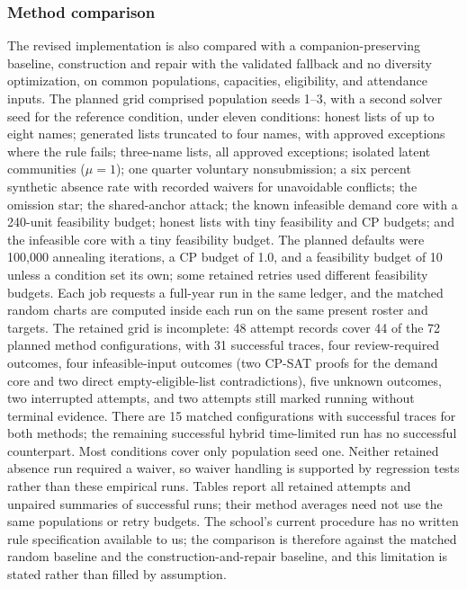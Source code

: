 \documentclass[11pt,a4paper]{article}
\theoremstyle{definition}\newtheorem{definition}[theorem]{Definition}
\theoremstyle{remark}\newtheorem{remark}[theorem]{Remark}
\begin{document}
\subsubsection*{Method comparison}\label{sec:evaldesign}
The revised implementation is also compared with a companion-preserving baseline, construction and repair with the validated fallback and no diversity optimization, on common populations, capacities, eligibility, and attendance inputs. The planned grid comprised population seeds 1--3, with a second solver seed for the reference condition, under eleven conditions: honest lists of up to eight names; generated lists truncated to four names, with approved exceptions where the rule fails; three-name lists, all approved exceptions; isolated latent communities ($\mu=1$); one quarter voluntary nonsubmission; a six percent synthetic absence rate with recorded waivers for unavoidable conflicts; the omission star; the shared-anchor attack; the known infeasible demand core with a 240-unit feasibility budget; honest lists with tiny feasibility and CP budgets; and the infeasible core with a tiny feasibility budget. The planned defaults were 100,000 annealing iterations, a CP budget of 1.0, and a feasibility budget of 10 unless a condition set its own; some retained retries used different feasibility budgets. Each job requests a full-year run in the same ledger, and the matched random charts are computed inside each run on the same present roster and targets. The retained grid is incomplete: 48 attempt records cover 44 of the 72 planned method configurations, with 31 successful traces, four review-required outcomes, four infeasible-input outcomes (two CP-SAT proofs for the demand core and two direct empty-eligible-list contradictions), five unknown outcomes, two interrupted attempts, and two attempts still marked running without terminal evidence. There are 15 matched configurations with successful traces for both methods; the remaining successful hybrid time-limited run has no successful counterpart. Most conditions cover only population seed one. Neither retained absence run required a waiver, so waiver handling is supported by regression tests rather than these empirical runs. Tables report all retained attempts and unpaired summaries of successful runs; their method averages need not use the same populations or retry budgets. The school's current procedure has no written rule specification available to us; the comparison is therefore against the matched random baseline and the construction-and-repair baseline, and this limitation is stated rather than filled by assumption.
\end{document}
